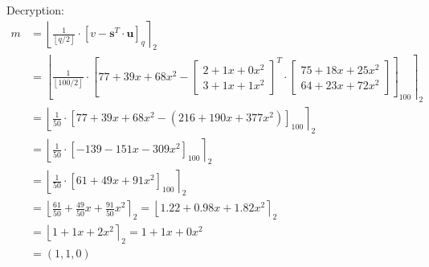 Decryption:
\begin{align*}
  m & = \left\lfloor \frac{1}{\left\lfloor q/2\right\rfloor} \cdot\left[v-\textbf{s}^T \cdot \textbf{u}\right]_{q}\right\rceil _2    \\
    & = \left\lfloor \frac{1}{\left\lfloor 100/2\right\rfloor} \cdot \left[77+39x+68x^2-
    \begin{bmatrix}2+ 1x + 0x^2 \\ 3+1x+1x^2 \end{bmatrix}^T
    \cdot
  \begin{bmatrix}75+18x+25x^2 \\ 64+23x+72x^2 \end{bmatrix} \right]_{100}\right\rceil _2                                             \\
    & = \left\lfloor \frac{1}{50} \cdot \left[77+39x+68x^2-(216+190x+377x^2)\right]_{100}\right\rceil _2                             \\
    & = \left\lfloor \frac{1}{50} \cdot \left[-139-151x-309x^2\right]_{100}\right\rceil _2                                           \\
    & = \left\lfloor \frac{1}{50} \cdot \left[61+49x+91x^2\right]_{100} \right\rceil _2                                              \\
    & = \left\lfloor \frac{61}{50} +\frac{49}{50}x+\frac{91}{50}x^2\right\rceil _2  = \left\lfloor 1.22+0.98x+1.82x^2\right\rceil _2 \\
    & = \left\lfloor1+1x+2x^2\right\rceil _2 =           1+1x+0x^2                                                                   \\
    & = (1,1,0)
\end{align*}